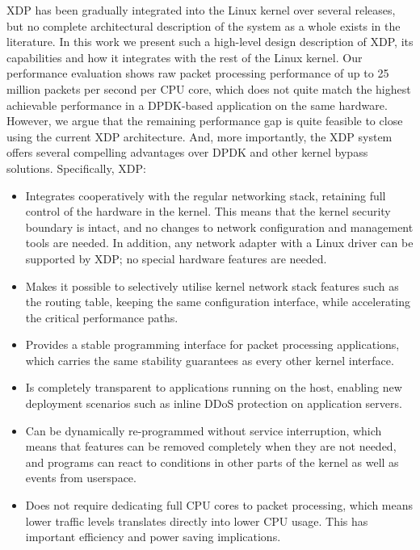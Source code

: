 \documentclass[10pt,sigconf,anonymous]{acmart}
\begin{document}
XDP has been gradually integrated into the Linux kernel over several releases,
but no complete architectural description of the system as a whole exists in the
literature. In this work we present such a high-level design description of XDP,
its capabilities and how it integrates with the rest of the Linux kernel. Our
performance evaluation shows raw packet processing performance of up to 25
million packets per second per CPU core, which does not quite match the highest
achievable performance in a DPDK-based application on the same hardware.
However, we argue that the remaining performance gap is quite feasible to close
using the current XDP architecture. And, more importantly, the XDP system offers
several compelling advantages over DPDK and other kernel bypass solutions.
Specifically, XDP:

\begin{itemize}
\item Integrates cooperatively with the regular networking stack, retaining full
  control of the hardware in the kernel. This means that the kernel security
  boundary is intact, and no changes to network configuration and management
  tools are needed. In addition, any network adapter with a Linux driver can be
  supported by XDP; no special hardware features are needed.

\item Makes it possible to selectively utilise kernel network stack features
  such as the routing table, keeping the same configuration interface, while
  accelerating the critical performance paths.

\item Provides a stable programming interface for packet processing
  applications, which carries the same stability guarantees as every other
  kernel interface.

\item Is completely transparent to applications running on the host, enabling
  new deployment scenarios such as inline DDoS protection on application
  servers.

\item Can be dynamically re-programmed without service interruption, which means
  that features can be removed completely when they are not needed, and programs
  can react to conditions in other parts of the kernel as well as events from
  userspace.

\item Does not require dedicating full CPU cores to packet processing, which
  means lower traffic levels translates directly into lower CPU usage. This has
  important efficiency and power saving implications.
\end{itemize}
\end{document}
